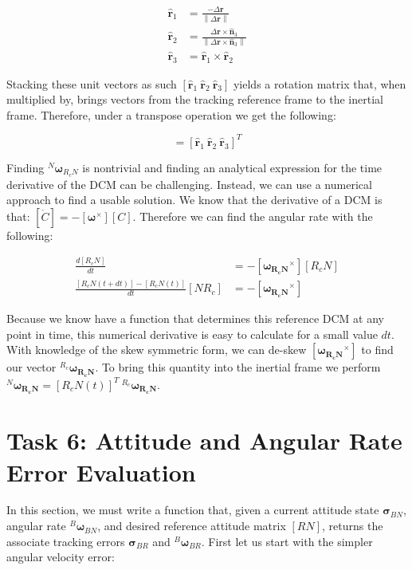 \documentclass[paper]{aiaaNew}
\newcommand{\norm}[1]{\left\lVert#1\right\rVert}
\begin{document}
\begin{align}
  \hat{\bm{r}}_1 &= \frac{-\Delta\bm{r}}{\norm{\Delta\bm{r}}} \\ 
  \hat{\bm{r}}_2 &= \frac{\Delta\bm{r} \times \hat{\bm{n}}_3}{\norm{\Delta\bm{r} \times \hat{\bm{n}}_3}} \\ 
  \hat{\bm{r}}_3 &= \hat{\bm{r}}_1 \times \hat{\bm{r}}_2 
\end{align}

Stacking these unit vectors as such $[\hat{\bm{r}}_1 \ \hat{\bm{r}}_2 \ \hat{\bm{r}}_3 ]$ yields a rotation matrix that, when multiplied by, brings vectors from the tracking reference frame to the inertial frame. Therefore, under a transpose operation we get the following: 

\begin{equation}
  [R_cN] = [\hat{\bm{r}}_1 \ \hat{\bm{r}}_2 \ \hat{\bm{r}}_3 ]^T
\end{equation}

Finding $^N\bm{\omega}_{R_cN}$ is nontrivial and finding an analytical expression for the time derivative of the DCM can be challenging. Instead, we can use a numerical approach to find a usable solution. We know that the derivative of a DCM is that: $[\dot{C}] = -[\bm{\omega}^\times][C]$. Therefore we can find the angular rate with the following:



\begin{align}
  \frac{d[R_cN]}{dt} &= -[\bm{\omega_{R_cN}}^\times][R_cN] \\
  \frac{[R_cN(t+dt)] - [R_cN(t)]}{dt} [NR_c] &= -[\bm{\omega_{R_cN}}^\times]
\end{align}

Because we know have a function that determines this reference DCM at any point in time, this numerical derivative is easy to calculate for a small value $dt$. With knowledge of the skew symmetric form, we can de-skew $[\bm{\omega_{R_cN}}^\times]$ to find our vector  $^{R_c}\bm{\omega_{R_cN}}$. To bring this quantity into the inertial frame we perform $^{N}\bm{\omega_{R_cN}} = [R_cN(t)]^T \ ^{R_c}\bm{\omega_{R_cN}}$.






\section*{Task 6: Attitude and Angular Rate Error Evaluation}
In this section, we must write a function that, given a current attitude state $\bm{\sigma}_{BN}$, angular rate $^B\bm{\omega}_{BN}$, and desired reference attitude matrix $[RN]$, returns the associate tracking errors $\bm{\sigma}_{BR}$ and $^B\bm{\omega}_{BR}$. First let us start with the simpler angular velocity error:
\end{document}
